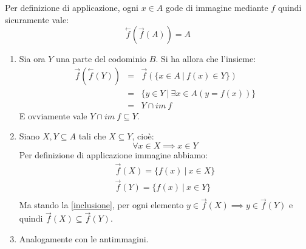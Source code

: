 Per definizione di applicazione, ogni $x \in A$ gode di immagine mediante $f$ quindi sicuramente vale: \[\stackrel{\leftarrow}{f}(\stackrel{\rightarrow}{f}(A))=A\]
\begin{enumerate}
	\item Sia ora $Y$ una parte del codominio $B$. Si ha allora che l'insieme:
	\begin{eqnarray*}
		\stackrel{\rightarrow}{f}(\stackrel{\leftarrow}{f}(Y))&=&\stackrel{\rightarrow}{f}(\{x \in A \ | \ f(x) \in Y\} ) \\
		&=& \{ y \in Y \ | \ \exists x \in A (y =f(x))\} \\
		&=& Y \cap im \ f
	\end{eqnarray*}
	E ovviamente vale $ Y \cap im \ f \subseteq Y$.
	\item Siano $X,Y \subseteq A$ tali che $X \subseteq Y$, cioè:
	\begin{equation}\label{inclusione}
		\forall x \in X \implies x \in Y
	\end{equation}
	Per definizione di applicazione immagine abbiamo:
	\begin{displaymath}
		\begin{array}{l}
			\stackrel{\rightarrow}{f}(X) =\{f(x) \ | \ x \in X \} \\
			\stackrel{\rightarrow}{f}(Y) =\{f(x) \ | \ x \in Y \} \\
		\end{array}
	\end{displaymath}
	Ma stando la \ref{inclusione}, per ogni elemento $y \in \stackrel{\rightarrow}{f}(X) \implies y \in \stackrel{\rightarrow}{f}(Y) $ e quindi $\stackrel{\rightarrow}{f}(X) \subseteq 	\stackrel{\rightarrow}{f}(Y)$.
	
	\item Analogamente con le antimmagini. \hfill \blacksquare
\end{enumerate}

